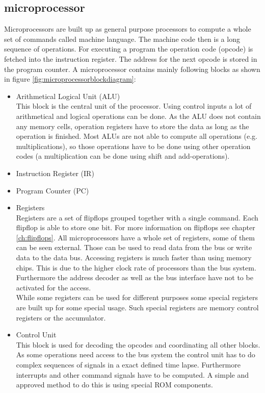 \subsection{microprocessor}
Microprocessors are built up as general purpose processors to compute a whole set of commands called machine language. The machine code then is a long sequence of operations. For executing a program the operation code (opcode) is fetched into the instruction register. The address for the next opcode is stored in the program counter. A microprocessor contains mainly following blocks as shown in figure \ref{fig:microprocessorblockdiagram}:
\begin{itemize}
\item Arithmetical Logical Unit (ALU)\\
This block is the central unit of the processor. Using control inputs a lot of arithmetical and logical operations can be done. As the ALU does not contain any memory cells, operation registers have to store the data as long as the operation is finished. Most ALUs are not able to compute all operations (e.g. multiplications), so those operations have to be done using other operation codes (a multiplication can be done using shift and add-operations). 
\item Instruction Register (IR)
\item Program Counter (PC)
\item Registers\\
Registers are a set of flipflops grouped together with a single command. Each flipflop is able to store one bit. For more information on flipflops see chapter \ref{ch:flipflops}. All microprocessors have a whole set of registers, some of them can be seen external. Those can be used to read data from the bus or write data to the data bus. Accessing registers is much faster than using memory chips. This is due to the higher clock rate of processors than the bus system. Furthermore the address decoder as well as the bus interface have not to be activated for the access.\\
While some registers can be used for different purposes some special registers are built up for some special usage. Such special registers are memory control registers or the accumulator. 
\item Control Unit\\
This block is used for decoding the opcodes and coordinating all other blocks. As some operations need access to the bus system the control unit has to do complex sequences of signals in a exact defined time lapse. Furthermore interrupts and other command signals have to be computed. A simple and approved method to do this is using special ROM components.\cite{Wue06}\\

\end{itemize}
